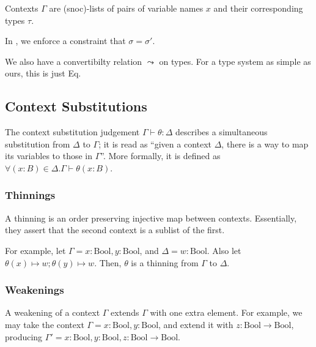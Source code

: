Contexts $\Gamma$ are (snoc)-lists of pairs of variable names $x$ and their corresponding types $\tau$.

In \Elim{$\to$}, we enforce a constraint that $\sigma = \sigma'$.

We also have a convertibilty relation $\leadsto$ on types. For a type system as simple as ours, this is just Eq.

\subsection{Context Substitutions}
The context substitution judgement $\Gamma \vdash \theta : \Delta$ describes a simultaneous substitution from $\Delta$ to $\Gamma$; it is read as ``given a context $\Delta$, there is a way to map its variables to those in $\Gamma$''. More formally, it is defined as $\forall (x : B) \in \Delta. \Gamma \vdash \theta (x : B)$.

\subsubsection{Thinnings}
A thinning is an order preserving injective map between contexts. Essentially, they assert that the second context is a sublist of the first.

For example, let $\Gamma = x : \mathrm{Bool}, y : \mathrm{Bool}$, and $\Delta = w : \mathrm{Bool}$. Also let $\theta(x) \mapsto w; \theta(y) \mapsto w$. Then, $\theta$ is a thinning from $\Gamma$ to $\Delta$.

\subsubsection{Weakenings}
A weakening of a context $\Gamma$ extends $\Gamma$ with one extra element. For example, we may take the context $\Gamma = x : \mathrm{Bool}, y : \mathrm{Bool}$, and extend it with $z : \mathrm{Bool} \to \mathrm{Bool}$, producing $\Gamma' = x : \mathrm{Bool}, y : \mathrm{Bool}, z : \mathrm{Bool} \to \mathrm{Bool}$.
